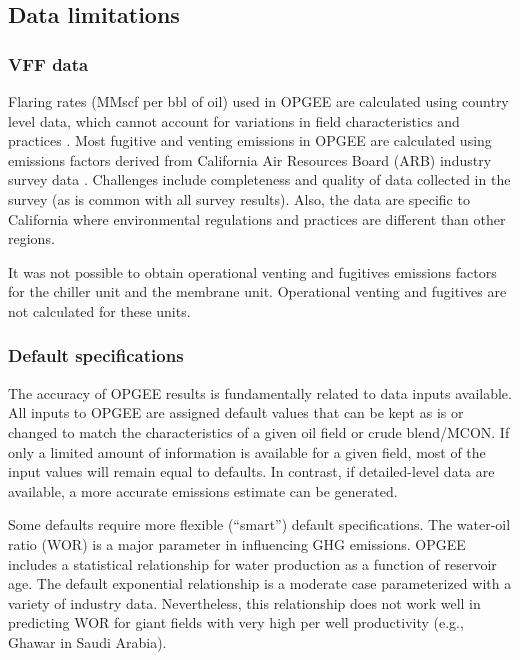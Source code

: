 \documentclass[11pt]{report}
\begin{document}
{{{{\subsection{Data limitations}

\subsubsection{VFF data}

Flaring rates (MMscf per bbl of oil) used in OPGEE are calculated using country level data, which cannot account for variations in field characteristics and practices \cite{NOAA2010,EIA2010}. Most fugitive and venting emissions in OPGEE are calculated using emissions factors derived from California Air Resources Board (ARB) industry survey data \cite{Lee2011}. Challenges include completeness and quality of data collected in the survey (as is common with all survey results). Also, the data are specific to California where environmental regulations and practices are different than other regions.\par

It was not possible to obtain operational venting and fugitives emissions factors for the chiller unit and the membrane unit. Operational venting and fugitives are not calculated for these units. 

\subsubsection{Default specifications}

The accuracy of OPGEE results is fundamentally related to data inputs available. All inputs to OPGEE are assigned default values that can be kept as is or changed to match the characteristics of a given oil field or crude blend/MCON. If only a limited amount of information is available for a given field, most of the input values will remain equal to defaults. In contrast, if detailed-level data are available, a more accurate emissions estimate can be generated. \par

Some defaults require more flexible (``smart'') default specifications. The water-oil ratio (WOR) is a major parameter in influencing GHG emissions. OPGEE includes a statistical relationship for water production as a function of reservoir age. The default exponential relationship is a moderate case parameterized with a variety of industry data. Nevertheless, this relationship does not work well in predicting WOR for giant fields with very high per well productivity (e.g., Ghawar in Saudi Arabia). \par

}}}}
\end{document}
